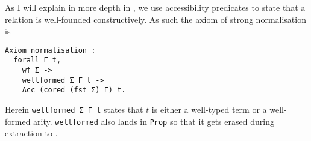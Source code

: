 As I will explain in more depth in , we use accessibility
predicates to state that a relation is well-founded constructively.
As such the axiom of strong normalisation is
\begin{verbatim}
Axiom normalisation :
  forall Γ t,
    wf Σ ->
    wellformed Σ Γ t ->
    Acc (cored (fst Σ) Γ) t.
\end{verbatim}
Herein \texttt{wellformed Σ Γ t} states that \(t\) is either a
well-typed term or a well-formed arity. \texttt{wellformed} also lands
in \texttt{Prop} so that it gets erased during extraction to \ocaml.
